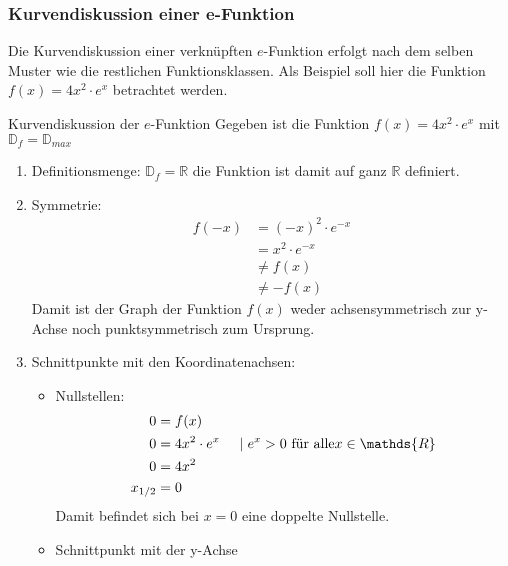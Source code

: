  \subsubsection{Kurvendiskussion einer e-Funktion}
 Die Kurvendiskussion einer verknüpften $e$-Funktion erfolgt nach dem selben Muster wie die restlichen Funktionsklassen. Als Beispiel soll hier die Funktion $f(x) = 4x^2\cdot e^x$ betrachtet werden.
 \begin{bsp}{Kurvendiskussion der $e$-Funktion}{}
Gegeben ist die Funktion $f(x) = 4x^2\cdot e^x$ mit $\mathds{D}_f = \mathds{D}_{max}$
\begin{enumerate}
    \item Definitionsmenge: $\mathds{D}_f = \mathds{R}$ die Funktion ist damit auf ganz $\mathds{R}$ definiert.
    \item Symmetrie:
    \begin{equation*}
        \begin{split}
            f(-x) &= (-x)^2 \cdot e^{-x}\\
            &= x^2\cdot e^{-x}\\
            &\neq f(x)\\
            &\neq -f(x)
        \end{split}
    \end{equation*}
    Damit ist der Graph der Funktion $f(x)$ weder achsensymmetrisch zur y-Achse noch punktsymmetrisch zum Ursprung.
    \item Schnittpunkte mit den Koordinatenachsen:
    \begin{itemize}
        \item Nullstellen:
        \begin{equation*}
            \begin{split}
                0 &=f(x)\\
               0 &= 4x^2\cdot e^x\hspace{0.5cm}|\hspace{0.1cm} e^x >0 \text{ für alle} x \in \mathds{R}\\
               0 &=4x^2\\
               x_{1/2} &= 0
            \end{split}
        \end{equation*}
        Damit befindet sich bei $x=0$ eine doppelte Nullstelle.
        \item Schnittpunkt mit der y-Achse
        \begin{equation*}
            \begin{split}

\end{split}
\end{equation*}
\end{itemize}
\end{enumerate}
\end{bsp}
